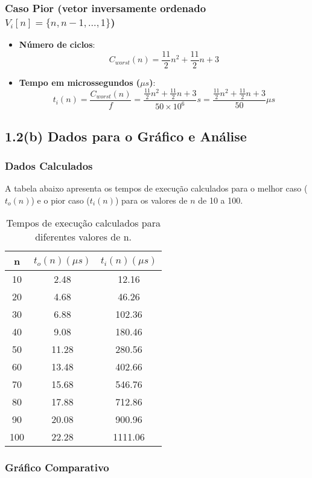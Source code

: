 \documentclass[12pt,a4paper]{article}
\begin{document}
\subsubsection*{Caso Pior (vetor inversamente ordenado $V_{i}[n]=\{n,n-1,...,1\}$)}
\begin{itemize}
    \item \textbf{Número de ciclos}:
    $$ C_{worst}(n) = \frac{11}{2}n^{2} + \frac{11}{2}n + 3 $$
    \item \textbf{Tempo em microssegundos ($\mu s$)}:
    $$ t_{i}(n) = \frac{C_{worst}(n)}{f} = \frac{\frac{11}{2}n^{2} + \frac{11}{2}n + 3}{50 \times 10^{6}}s = \frac{\frac{11}{2}n^{2} + \frac{11}{2}n + 3}{50}\mu s $$
\end{itemize}

\subsection*{1.2(b) Dados para o Gráfico e Análise}

\subsubsection*{Dados Calculados}
A tabela abaixo apresenta os tempos de execução calculados para o melhor caso ($t_o(n)$) e o pior caso ($t_i(n)$) para os valores de $n$ de 10 a 100.

\begin{table}[H]
\centering
\begin{tabular}{|c|c|c|}
\hline
\textbf{n} & \textbf{$t_o(n) (\mu s)$} & \textbf{$t_i(n) (\mu s)$} \\
\hline
10 & 2.48 & 12.16 \\
20 & 4.68 & 46.26 \\
30 & 6.88 & 102.36 \\
40 & 9.08 & 180.46 \\
50 & 11.28 & 280.56 \\
60 & 13.48 & 402.66 \\
70 & 15.68 & 546.76 \\
80 & 17.88 & 712.86 \\
90 & 20.08 & 900.96 \\
100 & 22.28 & 1111.06 \\
\hline
\end{tabular}
\caption{Tempos de execução calculados para diferentes valores de n.}
\end{table}

\subsubsection*{Gráfico Comparativo}
\end{document}
